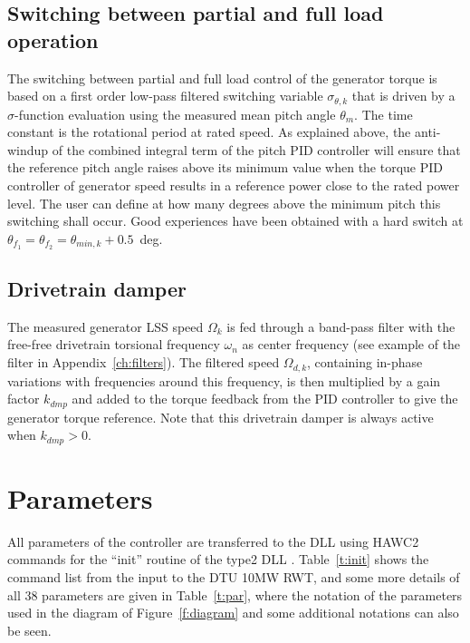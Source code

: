 \subsection{Switching between partial and full load operation}

The switching between partial and full load control of the generator torque is based on a first order low-pass filtered switching variable $\sigma_{\theta,k}$ that is driven by a $\sigma$-function evaluation using the measured mean pitch angle $\theta_m$. The time constant is the rotational period at rated speed. As explained above, the anti-windup of the combined integral term of the pitch PID controller will ensure that the reference pitch angle raises above its minimum value when the torque PID controller of generator speed results in a reference power close to the rated power level. The user can define at how many degrees above the minimum pitch this switching shall occur. Good experiences have been obtained with a hard switch at $\theta_{f_1}=\theta_{f_2}=\theta_{min,k}+0.5$~deg.

\subsection{Drivetrain damper}\label{s:dmp}

The measured generator LSS speed $\Omega_k$ is fed through a band-pass filter with the free-free drivetrain torsional frequency $\omega_n$ as center frequency (see example of the filter in Appendix~\ref{ch:filters}). The filtered speed $\Omega_{d,k}$, containing in-phase variations with frequencies around this frequency, is then multiplied by a gain factor $k_{dmp}$ and added to the torque feedback from the PID controller to give the generator torque reference. Note that this drivetrain damper is always active when $k_{dmp}>0$.

\section{Parameters}\label{s:par}

All parameters of the controller are transferred to the DLL using HAWC2 commands for the ``init'' routine of the type2 DLL \cite{Larsen12}. Table~\ref{t:init} shows the command list from the input to the DTU 10MW RWT, and some more details of all 38 parameters are given in Table~\ref{t:par}, where the notation of the parameters used in the diagram of Figure~\ref{f:diagram} and some additional notations can also be seen.

